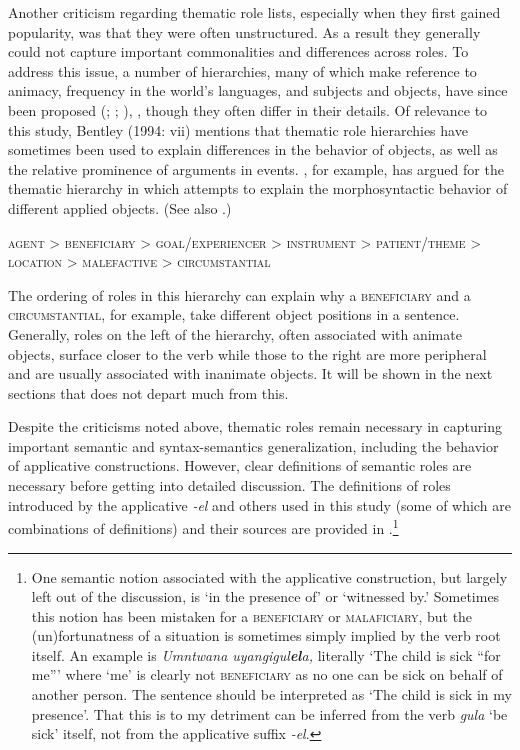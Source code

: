 \documentclass[output=paper]{langsci/langscibook}
\begin{document}
Another criticism regarding thematic role lists, especially when they first gained popularity, was that they were often unstructured. As a result they generally could not capture important commonalities and differences across roles. To address this issue, a number of hierarchies, many of which make reference to animacy, frequency in the world’s languages, and subjects and objects, have since been proposed (\citealt{Fillmore1968};  \citealt[12]{SaintDizierViegas1995};    \citealt[334]{KiyosawaGerdts2010}), \citet{BresnanKanerva1989}, though they often differ in their details. Of relevance to this study, Bentley (1994: vii) mentions that thematic role hierarchies have sometimes been used to explain differences in the behavior of objects, as well as the relative prominence of arguments in events. \citet[129]{Mchombo2004}, for example, has argued for the thematic hierarchy in  which attempts to explain the morphosyntactic behavior of different applied objects. (See also \citealt{NgonyaniGithinji2006}.)

\ea
\textsc{agent > beneficiary > goal/experiencer > instrument > patient/theme > location > malefactive > circumstantial}\\
\z

The ordering of roles in this hierarchy can explain why a \textsc{beneficiary} and a \textsc{circumstantial}, for example, take different object positions in a  sentence. Generally, roles on the left of the hierarchy, often associated with animate objects, surface closer to the verb while those to the right are more peripheral and are usually associated with inanimate objects. It will be shown in the next sections that  does not depart much from this.

 Despite the criticisms noted above, thematic roles remain necessary in capturing important semantic and syntax-semantics generalization, including the behavior of applicative constructions. However, clear definitions of semantic roles are necessary before getting into detailed discussion. The definitions of roles introduced by the  applicative \textit{-el} and others used in this study (some of which are combinations of definitions) and their sources are provided in .\footnote{One semantic notion associated with the  applicative construction, but largely left out of the discussion, is ‘in the presence of’ or ‘witnessed by.’ Sometimes this notion has been mistaken for a \textsc{beneficiary} or \textsc{malaficiary}, but the (un)fortunatness of a situation is sometimes simply implied by the verb root itself. An example is \textit{Umntwana uyangigul}\textbf{\textit{el}}\textit{a,} literally ‘The child is sick “for me”’ where ‘me’ is clearly not \textsc{beneficiary} as no one can be sick on behalf of another person. The sentence should be interpreted as ‘The child is sick in my presence’. That this is to my detriment can be inferred from the verb \textit{gula} ‘be sick’ itself, not from the applicative suffix \textit{-el}.} 
\end{document}
